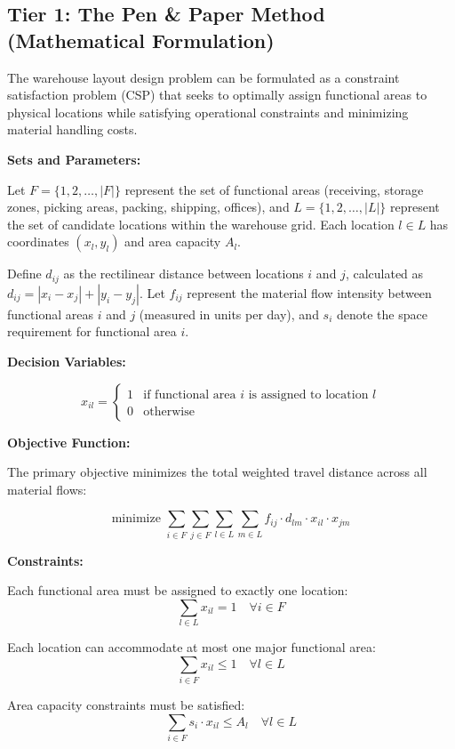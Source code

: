 \documentclass{article}
\begin{document}
\subsection{Tier 1: The Pen \& Paper Method (Mathematical Formulation)}

The warehouse layout design problem can be formulated as a constraint satisfaction problem (CSP) that seeks to optimally assign functional areas to physical locations while satisfying operational constraints and minimizing material handling costs.

\textbf{Sets and Parameters:}

Let $F = \{1, 2, \ldots, |F|\}$ represent the set of functional areas (receiving, storage zones, picking areas, packing, shipping, offices), and $L = \{1, 2, \ldots, |L|\}$ represent the set of candidate locations within the warehouse grid. Each location $l \in L$ has coordinates $(x_l, y_l)$ and area capacity $A_l$.

Define $d_{ij}$ as the rectilinear distance between locations $i$ and $j$, calculated as $d_{ij} = |x_i - x_j| + |y_i - y_j|$. Let $f_{ij}$ represent the material flow intensity between functional areas $i$ and $j$ (measured in units per day), and $s_i$ denote the space requirement for functional area $i$.

\textbf{Decision Variables:}

\[
x_{il} = \begin{cases}
1 & \text{if functional area } i \text{ is assigned to location } l \\
0 & \text{otherwise}
\end{cases}
\]

\textbf{Objective Function:}

The primary objective minimizes the total weighted travel distance across all material flows:

\[
\text{minimize } \sum_{i \in F} \sum_{j \in F} \sum_{l \in L} \sum_{m \in L} f_{ij} \cdot d_{lm} \cdot x_{il} \cdot x_{jm}
\]

\textbf{Constraints:}

Each functional area must be assigned to exactly one location:
\[
\sum_{l \in L} x_{il} = 1 \quad \forall i \in F
\]

Each location can accommodate at most one major functional area:
\[
\sum_{i \in F} x_{il} \leq 1 \quad \forall l \in L
\]

Area capacity constraints must be satisfied:
\[
\sum_{i \in F} s_i \cdot x_{il} \leq A_l \quad \forall l \in L
\]
\end{document}
